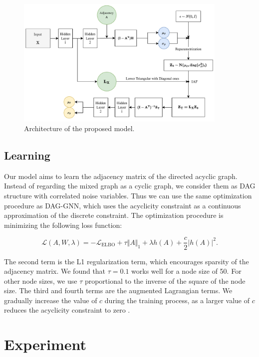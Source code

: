 \documentclass[10pt]{article}
\begin{document}
\begin{figure}[H]
    \centering
    \includegraphics[width=0.9\textwidth]{fig/model.pdf}
    \caption{Architecture of the proposed model.}
    \label{diagram}
\end{figure}

\subsection{Learning}

Our model aims to learn the adjacency matrix of the directed acyclic graph. Instead of regarding the mixed graph as a cyclic graph, we consider them as DAG structure with correlated noise variables. Thus we can use the same optimization procedure as DAG-GNN, which uses the acyclicity constraint as a continuous approximation of the discrete constraint. The optimization procedure is minimizing the following loss function:

\begin{equation}
    \mathcal{L}(A, W, \lambda) =-\mathcal{L}_{\mathrm{ELBO}} + \tau \Vert A \Vert_1 + \lambda h(A) + \frac{c}{2} |h(A)|^2.
\end{equation}

The second term is the L1 regularization term, which encourages sparsity of the adjacency matrix. We found that $\tau=0.1$ works well for a node size of 50. For other node sizes, we use $\tau$ proportional to the inverse of the square of the node size. The third and fourth terms are the augmented Lagrangian terms. We gradually increase the value of $c$ during the training process, as a larger value of $c$ reduces the acyclicity constraint to zero \cite{yu2019daggnn}.


\section{Experiment}
\end{document}

